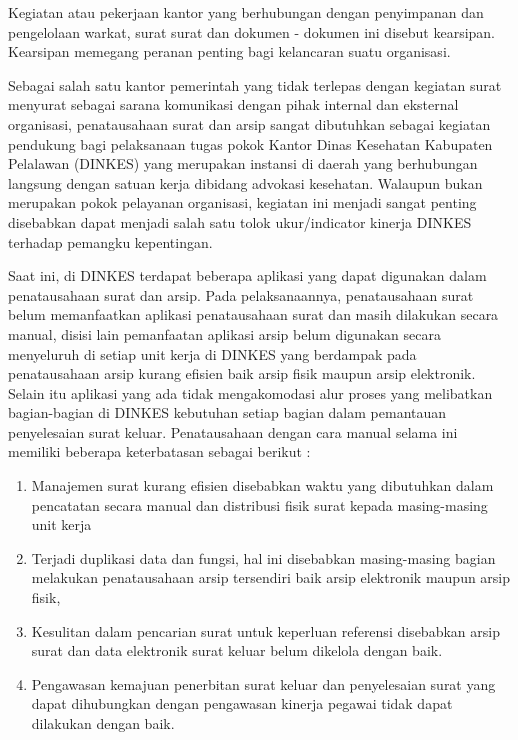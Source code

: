Kegiatan atau pekerjaan kantor yang berhubungan dengan penyimpanan dan pengelolaan warkat, surat surat dan dokumen - dokumen ini disebut kearsipan. Kearsipan memegang peranan penting bagi kelancaran suatu organisasi.

Sebagai salah satu kantor pemerintah yang tidak terlepas dengan kegiatan surat menyurat sebagai sarana komunikasi dengan pihak internal dan eksternal organisasi, penatausahaan surat dan arsip sangat dibutuhkan sebagai kegiatan pendukung bagi pelaksanaan tugas pokok Kantor Dinas Kesehatan Kabupaten Pelalawan (DINKES) yang merupakan instansi di daerah yang berhubungan langsung dengan satuan kerja dibidang advokasi kesehatan. Walaupun bukan merupakan pokok pelayanan organisasi, kegiatan ini menjadi sangat penting disebabkan dapat menjadi salah satu tolok ukur/indicator kinerja DINKES terhadap pemangku kepentingan.

Saat ini, di DINKES terdapat beberapa aplikasi yang dapat digunakan dalam penatausahaan surat dan arsip. Pada pelaksanaannya, penatausahaan surat belum memanfaatkan aplikasi penatausahaan surat dan masih dilakukan secara manual, disisi lain pemanfaatan aplikasi arsip belum digunakan secara menyeluruh di setiap unit kerja di DINKES yang berdampak pada penatausahaan arsip kurang efisien baik arsip fisik maupun arsip elektronik. Selain itu aplikasi yang ada tidak mengakomodasi alur proses yang melibatkan bagian-bagian di DINKES kebutuhan setiap bagian dalam pemantauan penyelesaian surat keluar. Penatausahaan dengan cara manual selama ini memiliki beberapa keterbatasan sebagai berikut :
\begin{enumerate}
\item Manajemen surat kurang efisien disebabkan waktu yang dibutuhkan dalam pencatatan secara manual dan distribusi fisik surat kepada masing-masing unit kerja
\item Terjadi duplikasi data dan fungsi, hal ini disebabkan masing-masing bagian melakukan penatausahaan arsip tersendiri baik arsip elektronik maupun arsip fisik,
\item Kesulitan dalam pencarian surat untuk keperluan referensi disebabkan arsip surat dan data elektronik surat keluar belum dikelola dengan baik.
\item Pengawasan kemajuan penerbitan surat keluar dan penyelesaian surat yang dapat dihubungkan dengan pengawasan kinerja pegawai tidak dapat dilakukan dengan baik.
\end{enumerate}

